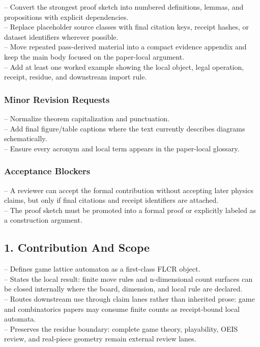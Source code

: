 \documentclass[11pt]{article}
\begin{document}
\noindent{}-- Convert the strongest proof sketch into numbered definitions, lemmas, and propositions with explicit dependencies.\\
\noindent{}-- Replace placeholder source classes with final citation keys, receipt hashes, or dataset identifiers wherever possible.\\
\noindent{}-- Move repeated pass-derived material into a compact evidence appendix and keep the main body focused on the paper-local argument.\\
\noindent{}-- Add at least one worked example showing the local object, legal operation, receipt, residue, and downstream import rule.\\

\subsubsection*{Minor Revision Requests}

\noindent{}-- Normalize theorem capitalization and punctuation.\\
\noindent{}-- Add final figure/table captions where the text currently describes diagrams schematically.\\
\noindent{}-- Ensure every acronym and local term appears in the paper-local glossary.\\

\subsubsection*{Acceptance Blockers}

\noindent{}-- A reviewer can accept the formal contribution without accepting later physics claims, but only if final citations and receipt identifiers are attached.\\
\noindent{}-- The proof sketch must be promoted into a formal proof or explicitly labeled as a construction argument.\\


\subsection*{1. Contribution And Scope}

\noindent{}-- Defines game lattice automaton as a first-class FLCR object.\\
\noindent{}-- States the local result: finite move rules and n-dimensional count surfaces can be closed internally where the board, dimension, and local rule are declared.\\
\noindent{}-- Routes downstream use through claim lanes rather than inherited prose: game and combinatorics papers may consume finite counts as receipt-bound local automata.\\
\noindent{}-- Preserves the residue boundary: complete game theory, playability, OEIS review, and real-piece geometry remain external review lanes.\\
\end{document}
